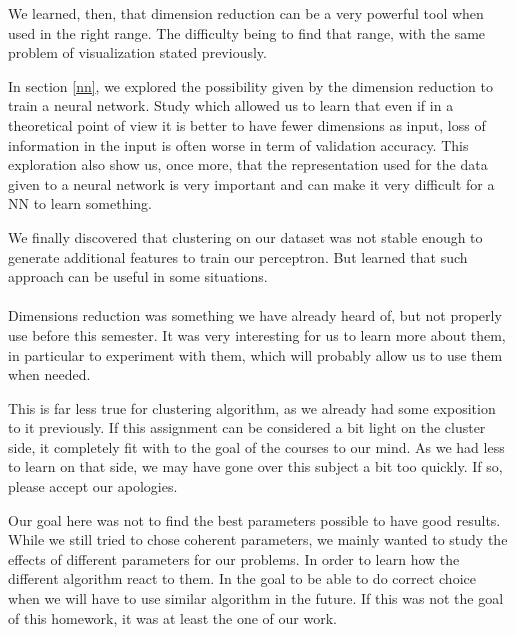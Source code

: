 \documentclass[twocolumn,a4paper,10pt]{article}
\begin{document}
We learned, then, that dimension reduction can be a very powerful tool when used in the right range. The difficulty being to find that range, with the same problem of visualization stated previously.

In section \ref{nn}, we explored the possibility given by the dimension reduction to train a neural network. Study which allowed us to learn that even if in a theoretical point of view it is better to have fewer dimensions as input, loss of information in the input is often worse in term of validation accuracy. This exploration also show us, once more, that the representation used for the data given to a neural network is very important and can make it very difficult for a NN to learn something.

We finally discovered that clustering on our dataset was not stable enough to generate additional features to train our perceptron. But learned that such approach can be useful in some situations.

\paragraph{}
Dimensions reduction was something we have already heard of, but not properly use before this semester. It was very interesting for us to learn more about them, in particular to experiment with them, which will probably allow us to use them when needed.

This is far less true for clustering algorithm, as we already had some exposition to it previously. If this assignment can be considered a bit light on the cluster side, it completely fit with to the goal of the courses to our mind. As we had less to learn on that side, we may have gone over this subject a bit too quickly. If so, please accept our apologies.

Our goal here was not to find the best parameters possible to have good results. While we still tried to chose coherent parameters, we mainly wanted to study the effects of different parameters for our problems. In order to learn how the different algorithm react to them. In the goal to be able to do correct choice when we will have to use similar algorithm in the future. If this was not the goal of this homework, it was at least the one of our work.
\end{document}
